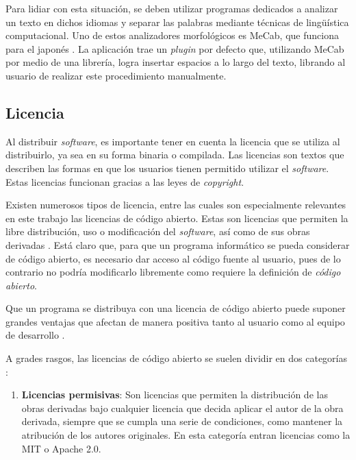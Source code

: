 Para lidiar con esta situación, se deben utilizar programas dedicados a analizar un texto en dichos idiomas y separar las palabras mediante técnicas de lingüística computacional. Uno de estos analizadores morfológicos es MeCab, que funciona para el japonés \autocite{MeCab}. La aplicación trae un \textit{plugin} por defecto que, utilizando MeCab por medio de una librería, logra insertar espacios a lo largo del texto, librando al usuario de realizar este procedimiento manualmente.

\subsection{Licencia}

Al distribuir \textit{software}, es importante tener en cuenta la licencia que se utiliza al distribuirlo, ya sea en su forma binaria o compilada. Las licencias son textos que describen las formas en que los usuarios tienen permitido utilizar el \textit{software}. Estas licencias funcionan gracias a las leyes de \textit{copyright}.

Existen numerosos tipos de licencia, entre las cuales son especialmente relevantes en este trabajo las licencias de código abierto. Estas son licencias que permiten la libre distribución, uso o modificación del \textit{software}, así como de sus obras derivadas \citationNeeded. Está claro que, para que un programa informático se pueda considerar de código abierto, es necesario dar acceso al código fuente al usuario, pues de lo contrario no podría modificarlo libremente como requiere la definición de \textit{código abierto}.

Que un programa se distribuya con una licencia de código abierto puede suponer grandes ventajas que afectan de manera positiva tanto al usuario como al equipo de desarrollo \autocite{almarzouq2005open, Heron2013}.

A grades rasgos, las licencias de código abierto se suelen dividir en dos categorías \citationNeeded:

\begin{enumerate}
	\item \textbf{Licencias permisivas}: Son licencias que permiten la distribución de las obras derivadas bajo cualquier licencia que decida aplicar el autor de la obra derivada, siempre que se cumpla una serie de condiciones, como mantener la atribución de los autores originales. En esta categoría entran licencias como la MIT o Apache 2.0.
\end{enumerate}

